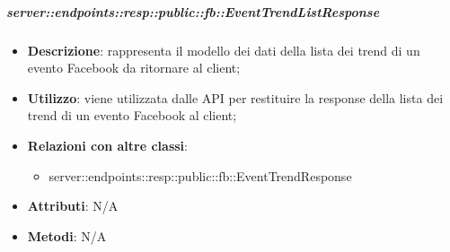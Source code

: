     \subparagraph{server::endpoints::resp::public::fb::EventTrendListResponse} %
    \label{subp:bdsm_app_server_endpoints_resp_public_fb_eventtrendlistresponse}
    \begin{itemize}
      \item \textbf{Descrizione}: rappresenta il modello dei dati della lista dei trend di un evento Facebook da ritornare al client;
      \item \textbf{Utilizzo}: viene utilizzata dalle API per restituire la response della lista dei trend di un evento Facebook al client;
      \item \textbf{Relazioni con altre classi}:
        \begin{itemize}
          \item server::endpoints::resp::public::fb::EventTrendResponse
        \end{itemize}
	  \item \textbf{Attributi}: N/A
	  \item \textbf{Metodi}: N/A
      \end{itemize}


